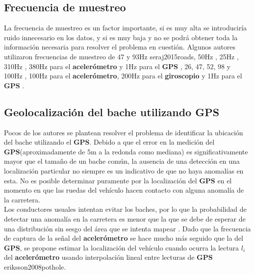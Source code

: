 	\subsection{Frecuencia de muestreo}
		La frecuencia de muestreo es un factor importante, si es muy alta se introduciría ruido innecesario en los datos, y si es muy baja y no se podrá
		obtener toda la información necesaria para resolver el problema en cuestión. Algunos autores utilizaron frecuencias de muestreo de 47 y 93Hz \brackcite
		{seraj2015roads}, 50Hz , 25Hz , 310Hz , 380Hz para el 
		\textbf{acelerómetro} y 1Hz para el \textbf{GPS} , 26, 47, 52, 98 y 100Hz , 100Hz para el 
		\textbf{acelerómetro}, 200Hz para el \textbf{giroscopio} y 1Hz para el \textbf{GPS} .

	\subsection{Geolocalización del bache utilizando GPS}
		Pocos de los autores se plantean resolver el problema de identificar la ubicación del bache utilizando el \textbf{GPS}. Debido a que el
		error en la medición del \textbf{GPS}(aproximadamente de 5m a la redonda como mediana) es significativamente mayor que el tamaño de un bache
		común, la ausencia de una detección en una localización particular no siempre es un indicativo de que no haya anomalías en esta. No es
		posible determinar puramente por la localización del \textbf{GPS} en el momento en que las ruedas del vehículo hacen contacto con alguna
		anomalía de la carretera.\\
		\indent Los conductores usuales intentan evitar los baches, por lo que la probabilidad de detectar una anomalía en la carretera es menor que la
		que se debe de esperar de una distribución sin sesgo del área que se intenta mapear . Dado que la frecuencia
		de captura de la señal del \textbf{acelerómetro} se hace mucho más seguido que la del \textbf{GPS}, se propone estimar la localización del
		vehículo cuando ocurra la lectura $l_i$ del \textbf{acelerómetro} usando interpolación lineal entre lecturas de \textbf{GPS} \brackcite
		{eriksson2008pothole}.

